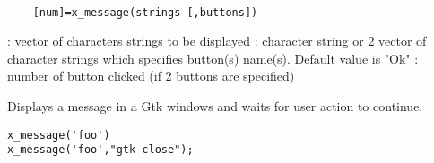 \begin{mandesc}
  \\ %
\end{mandesc}
\label{x-message}
\begin{calling_sequence}
  \begin{verbatim}
    [num]=x_message(strings [,buttons])   
  \end{verbatim}
\end{calling_sequence}
\begin{parameters}
  \begin{varlist}
    : vector of characters strings to be displayed
    : character string or 2 vector of character strings which specifies button(s) name(s). Default value is "Ok"
    : number  of button clicked (if 2 buttons are specified)
  \end{varlist}
\end{parameters}
\begin{mandescription}
  Displays a message in a Gtk windows and waits for user action to continue. 
\end{mandescription}
\begin{examples}
\begin{Verbatim}
x_message('foo')
x_message('foo',"gtk-close");
\end{Verbatim}
\end{examples}
\begin{manseealso}
\end{manseealso}


